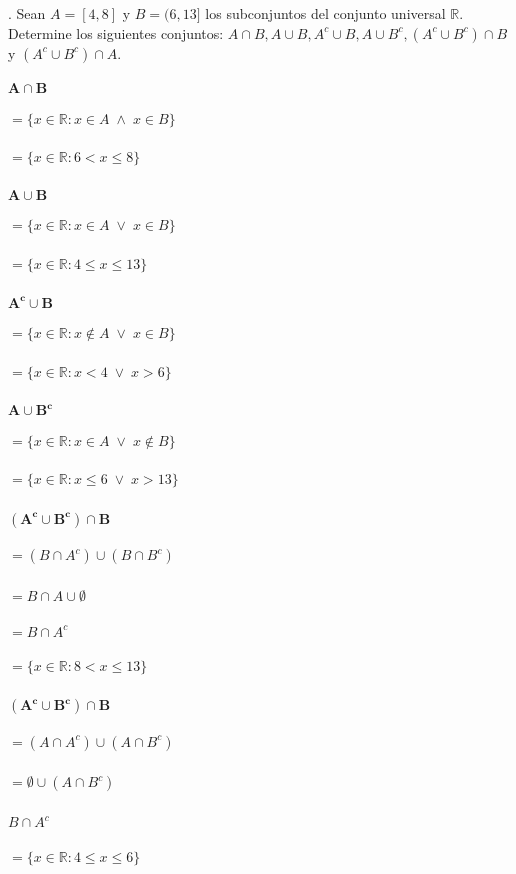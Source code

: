 \section{}
. Sean $A = [4,8]$ y $B = (6, 13]$ los subconjuntos del conjunto universal $\mathbb{R}$. Determine los siguientes conjuntos: $A \cap B, A \cup B, A^c \cup B , A \cup B^c , (A^c \cup B^c) \cap B$ y $(A^c \cup B^c) \cap A.$\\

\paragraph{$\mathbf{A \cap B}$}
	\subparagraph{$= \{x \in \mathbb{R} : x \in A \; \wedge \; x \in B\}$}
	\subparagraph{$= \{x \in \mathbb{R} : 6 < x \leq 8\}$}
\paragraph{$\mathbf{A \cup B}$}
	\subparagraph{$= \{x \in \mathbb{R} : x \in A \; \vee \; x \in B\}$}
	\subparagraph{$= \{x \in \mathbb{R} : 4 \leq x \leq 13\}$}
\paragraph{$\mathbf{A^c \cup B}$}
	\subparagraph{$= \{x \in \mathbb{R} : x \notin A \; \vee \; x \in B\}$}
	\subparagraph{$= \{x \in \mathbb{R} : x<4 \; \vee \; x>6\}$}
\paragraph{$\mathbf{A \cup B^c}$}
	\subparagraph{$= \{x \in \mathbb{R} : x \in A \; \vee \; x \notin B\}$}
	\subparagraph{$= \{x \in \mathbb{R} : x \leq 6 \; \vee \; x>13\}$}
\paragraph{$\mathbf{(A^c \cup B^c) \cap B}$}
	\subparagraph{$= (B \cap A^c) \cup (B \cap B^c)$}
	\subparagraph{$= B \cap A \cup \emptyset$}
	\subparagraph{$
	= B \cap A^c$}
	\subparagraph{$= \{x \in \mathbb{R} : 8 < x \leq 13\}$}
\paragraph{$\mathbf{(A^c \cup B^c) \cap B}$}
	\subparagraph{$= (A \cap A^c) \cup (A \cap B^c)$}
	\subparagraph{$= \emptyset \cup (A \cap B^c)$}
	\subparagraph{$B \cap A^c$}
	\subparagraph{$= \{x \in \mathbb{R} : 4 \leq x \leq 6\}$}